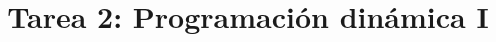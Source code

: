 \documentclass{doc}
\title{Tarea 2: Programación dinámica I}
\begin{document}
\makedocheader

\end{document}
